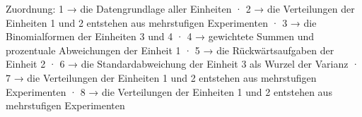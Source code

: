 
Zuordnung: 1 → die Datengrundlage aller Einheiten · 2 → die Verteilungen der Einheiten 1 und 2 entstehen aus mehrstufigen Experimenten · 3 → die Binomialformen der Einheiten 3 und 4 · 4 → gewichtete Summen und prozentuale Abweichungen der Einheit 1 · 5 → die Rückwärtsaufgaben der Einheit 2 · 6 → die Standardabweichung der Einheit 3 als Wurzel der Varianz · 7 → die Verteilungen der Einheiten 1 und 2 entstehen aus mehrstufigen Experimenten · 8 → die Verteilungen der Einheiten 1 und 2 entstehen aus mehrstufigen Experimenten

